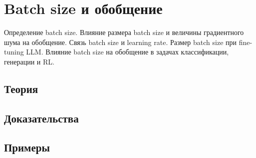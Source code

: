 
\section{Batch size и обобщение}
\label{sec:2.5.02-batch-size}

\begin{ticket}
Определение batch size. Влияние размера batch size и величины градиентного шума на обобщение. Связь batch size и learning rate. Размер batch size при fine-tuning LLM. Влияние batch size на обобщение в задачах классификации, генерации и RL.
\end{ticket}

\subsection*{Теория}

\subsection*{Доказательства}

\subsection*{Примеры}
